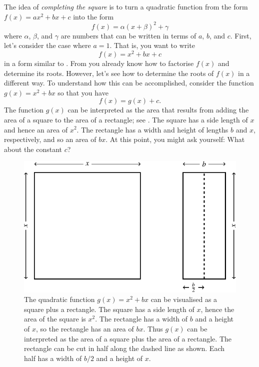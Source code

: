 \documentclass[a4paper,oneside,12pt]{article}
\begin{document}
The idea of \emph{completing the square} is to turn a quadratic
function from the form $f(x) = ax^2 + bx + c$ into the form
\begin{equation}
\label{eqn:completing_square_general_form}
f(x)
=
\alpha(x + \beta)^2 + \gamma
\end{equation}
where $\alpha$, $\beta$, and $\gamma$ are numbers that can be written
in terms of $a$, $b$, and $c$.  First, let's consider the case where
$a = 1$.  That is, you want to write
\[
f(x)
=
x^2 + bx + c
\]
in a form similar to .
From  you already know how to
factorise $f(x)$ and determine its roots.  However, let's see how to
determine the roots of $f(x)$ in a different way.  To understand how
this can be accomplished, consider the function $g(x) = x^2 + bx$ so
that you have
\begin{equation}
\label{eqn:completing_square_special_case}
f(x)
=
g(x) + c.
\end{equation}
The function $g(x)$ can be interpreted as the area that results from
adding the area of a square to the area of a rectangle; see
.  The
square has a side length of $x$ and hence an area of $x^2$.  The
rectangle has a width and height of lengths $b$ and $x$, respectively,
and so an area of $bx$.  At this point, you might ask yourself:  What
about the constant $c$?

\begin{figure}[!htbp]
\centering
\includegraphics[scale=1.1]{image/10/complete-square-a1-c0.pdf}
\caption{%
  The quadratic function $g(x) = x^2 + bx$ can be visualised as a
  square plus a rectangle.  The square has a side length of $x$, hence
  the area of the square is $x^2$.  The rectangle has a width of $b$
  and a height of $x$, so the rectangle has an area of $bx$.  Thus
  $g(x)$ can be interpreted as the area of a square plus the area of a
  rectangle.  The rectangle can be cut in half along the dashed line
  as shown.  Each half has a width of $b/2$ and a height of $x$.
}
\label{fig:special_complete_square_square_plus_rectangle}
\end{figure}
\end{document}
